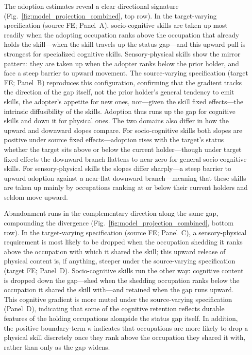 \documentclass[11pt, letterpaper]{article} %
\begin{document}

 
The adoption estimates reveal a clear directional signature (Fig.~\ref{fig:model_projection_combined}, top row). In the target-varying specification (source FE; Panel~A), socio-cognitive skills are taken up most readily when the adopting occupation ranks above the occupation that already holds the skill—when the skill travels up the status gap—and this upward pull is strongest for specialized cognitive skills. Sensory-physical skills show the mirror pattern: they are taken up when the adopter ranks below the prior holder, and face a steep barrier to upward movement. The source-varying specification (target FE; Panel~B) reproduces this configuration, confirming that the gradient tracks the direction of the gap itself, not the prior holder's general tendency to emit skills, the adopter's appetite for new ones, nor---given the skill fixed effects---the intrinsic diffusibility of the skills. Adoption thus runs up the gap for cognitive skills and down it for physical ones. The two domains also differ in how the upward and downward slopes compare. For socio-cognitive skills both slopes are positive under source fixed effects---adoption rises with the target's status whether the target sits above or below the current holder---though under target fixed effects the downward branch flattens to near zero for general socio-cognitive skills. For sensory-physical skills the slopes differ sharply---a steep barrier to upward adoption against a near-flat downward branch---meaning that these skills are taken up mainly by occupations ranking at or below their current holders and seldom move upward.

Abandonment runs in the complementary direction along the same gap, compounding the divergence (Fig.~\ref{fig:model_projection_combined}, bottom row). In the target-varying specification (source FE; Panel~C), a sensory-physical requirement is most likely to be dropped when the occupation shedding it ranks above the occupation with which it shared the skill; this upward release of physical content is, if anything, steeper under the source-varying specification (target FE; Panel~D). Socio-cognitive skills run the other way: cognitive content is dropped down the gap—shed when the shedding occupation ranks below the occupation it shared the skill with—and retained when the gap runs upward. This cognitive gradient is more muted under the source-varying specification (Panel~D), indicating that some of the cognitive retention reflects durable features of the holding occupations alongside the status gap itself. In addition, the positive boundary-term $\kappa$ indicates that occupations are more likely to drop a physical skill discretely once they rank above the occupation they shared it with, rather than only as the gap widens.
\end{document}
